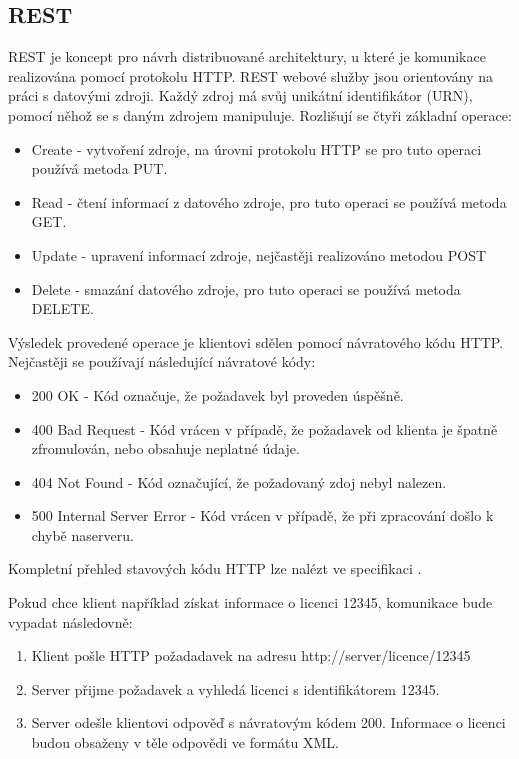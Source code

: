 \subsection{REST}

\gls{REST} je koncept pro návrh distribuované architektury, u které je
komunikace realizována pomocí protokolu \gls{HTTP}. \gls{REST} webové služby
jsou orientovány na práci s datovými zdroji. Každý zdroj má svůj unikátní
identifikátor (\gls{URN}), pomocí něhož se s daným zdrojem manipuluje. Rozlišují
se čtyři základní operace:

\begin{itemize}
  \item Create - vytvoření zdroje, na úrovni protokolu \gls{HTTP} se pro tuto
  operaci používá metoda PUT.
  \item Read - čtení informací z datového zdroje, pro tuto operaci se používá
  metoda GET.
  \item Update - upravení informací zdroje, nejčastěji realizováno metodou POST
  \item Delete - smazání datového zdroje, pro tuto operaci se používá metoda
  DELETE.
\end{itemize}

Výsledek provedené operace je klientovi sdělen pomocí návratového kódu
\gls{HTTP}. Nejčastěji se používají následující návratové kódy:

\begin{itemize}
  \item 200 OK - Kód označuje, že požadavek byl proveden úspěšně.
  \item 400 Bad Request - Kód vrácen v případě, že požadavek od klienta je
  špatně zfromulován, nebo obsahuje neplatné údaje.
  \item 404 Not Found - Kód označující, že požadovaný zdoj nebyl nalezen.
  \item 500 Internal Server Error - Kód vrácen v případě, že při zpracování
  došlo k chybě naserveru.
\end{itemize}

Kompletní přehled stavových kódu \gls{HTTP} lze nalézt ve specifikaci
\cite{rfc-http}.

Pokud chce klient například získat informace o licenci 12345, komunikace bude
vypadat následovně:

\begin{enumerate}
  \item Klient pošle \gls{HTTP} požadadavek na adresu
  http://server/licence/12345
  \item Server přijme požadavek a vyhledá licenci s identifikátorem 12345.
  \item Server odešle klientovi odpověď s návratovým kódem 200. Informace o
  licenci budou obsaženy v těle odpovědi ve formátu \gls{XML}.
\end{enumerate}

